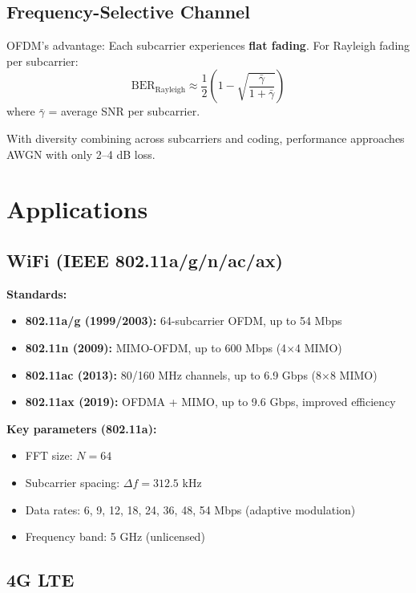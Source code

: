 \subsection{Frequency-Selective Channel}

OFDM's advantage: Each subcarrier experiences \textbf{flat fading}. For Rayleigh fading per subcarrier:
\begin{equation}
\mathrm{BER}_{\mathrm{Rayleigh}} \approx \frac{1}{2}\left(1 - \sqrt{\frac{\bar{\gamma}}{1 + \bar{\gamma}}}\right)
\end{equation}
where $\bar{\gamma}$ = average SNR per subcarrier.

With diversity combining across subcarriers and coding, performance approaches AWGN with only 2--4 dB loss.

\section{Applications}

\subsection{WiFi (IEEE 802.11a/g/n/ac/ax)}

\textbf{Standards:}
\begin{itemize}
\item \textbf{802.11a/g (1999/2003):} 64-subcarrier OFDM, up to 54 Mbps
\item \textbf{802.11n (2009):} MIMO-OFDM, up to 600 Mbps (4$\times$4 MIMO)
\item \textbf{802.11ac (2013):} 80/160 MHz channels, up to 6.9 Gbps (8$\times$8 MIMO)
\item \textbf{802.11ax (2019):} OFDMA + MIMO, up to 9.6 Gbps, improved efficiency
\end{itemize}

\textbf{Key parameters (802.11a):}
\begin{itemize}
\item FFT size: $N = 64$
\item Subcarrier spacing: $\Delta f = 312.5$ kHz
\item Data rates: 6, 9, 12, 18, 24, 36, 48, 54 Mbps (adaptive modulation)
\item Frequency band: 5 GHz (unlicensed)
\end{itemize}

\subsection{4G LTE}

